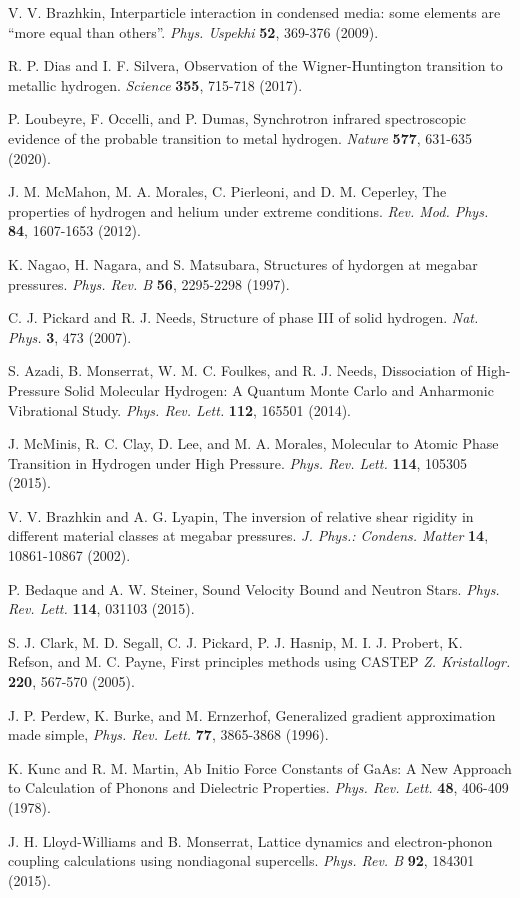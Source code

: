 \documentclass[aps,prl,groupedaddress,fleqn,twocolumn,10pt]{revtex4}
\begin{document}
\begin{thebibliography}{99}
 V. V. Brazhkin, Interparticle interaction in condensed media: some elements are ``more equal than others''. {\it Phys. Uspekhi} {\bf 52}, 369-376 (2009).

 R. P. Dias and I. F. Silvera, Observation of the Wigner-Huntington transition to metallic hydrogen. {\it Science} {\bf 355}, 715-718 (2017).

 P. Loubeyre, F. Occelli, and P. Dumas, Synchrotron infrared spectroscopic evidence of the probable transition to metal hydrogen. {\it Nature} {\bf 577}, 631-635 (2020).

 J. M. McMahon, M. A. Morales, C. Pierleoni, and D. M. Ceperley, The properties of hydrogen and helium under extreme conditions. {\it Rev. Mod. Phys.} {\bf 84}, 1607-1653 (2012).

 K. Nagao, H. Nagara, and S. Matsubara, Structures of hydorgen at megabar pressures. {\it Phys. Rev. B} {\bf 56}, 2295-2298 (1997).

 C. J. Pickard and R. J. Needs, Structure of phase III of solid hydrogen. {\it Nat. Phys.} {\bf 3}, 473 (2007).

 S. Azadi, B. Monserrat, W. M. C. Foulkes, and R. J. Needs, Dissociation of High-Pressure Solid Molecular Hydrogen: A Quantum Monte Carlo and Anharmonic Vibrational Study. {\it Phys. Rev. Lett.} {\bf 112}, 165501 (2014).

 J. McMinis, R. C. Clay, D. Lee, and M. A. Morales, Molecular to Atomic Phase Transition in Hydrogen under High Pressure. {\it Phys. Rev. Lett.} {\bf 114}, 105305 (2015).

 V. V. Brazhkin and A. G. Lyapin, The inversion of relative shear rigidity in different material classes at megabar pressures. {\it J. Phys.: Condens. Matter} {\bf 14}, 10861-10867 (2002).

 P. Bedaque and A. W. Steiner, Sound Velocity Bound and Neutron Stars. {\it Phys. Rev. Lett.} {\bf 114}, 031103 (2015).

 S. J. Clark, M. D. Segall, C. J. Pickard, P. J. Hasnip, M. I. J. Probert, K. Refson, and M. C. Payne, First principles methods using CASTEP {\it Z. Kristallogr.} {\bf 220}, 567-570 (2005).

 J. P. Perdew, K. Burke, and M. Ernzerhof, Generalized gradient approximation made simple, {\it Phys. Rev. Lett.} {\bf 77}, 3865-3868 (1996).

 K. Kunc and R. M. Martin, Ab Initio Force Constants of GaAs: A New Approach to Calculation of Phonons and Dielectric Properties. {\it Phys. Rev. Lett.} {\bf 48}, 406-409 (1978).

 J. H. Lloyd-Williams and B. Monserrat, Lattice dynamics and electron-phonon coupling calculations using nondiagonal supercells. {\it Phys. Rev. B} {\bf 92}, 184301 (2015).

\end{thebibliography}
\end{document}
